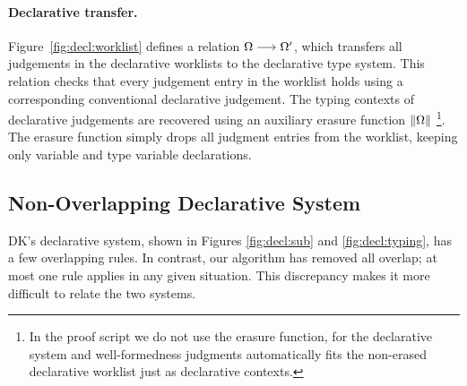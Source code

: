 \paragraph{Declarative transfer.}
Figure~\ref{fig:decl:worklist} defines a relation $\Omega \longrightarrow \Omega'$,
which transfers all judgements in the declarative worklists to the
declarative type system. This relation checks that every judgement entry in the worklist
holds using a corresponding conventional declarative judgement. 
The typing contexts of declarative judgements are recovered using an
auxiliary erasure function $\|\Omega\|$
\footnote{In the proof script we do not use the erasure function,
for the declarative system and well-formedness judgments automatically fits
the non-erased declarative worklist just as declarative contexts.}.
The erasure function simply drops all judgment entries from the worklist,
keeping only variable and type variable declarations.

\subsection{Non-Overlapping Declarative System}
\label{sec:metatheory:non-overlapping}

DK's declarative system, shown in Figures \ref{fig:decl:sub} and
\ref{fig:decl:typing}, has a few overlapping rules. In contrast, our algorithm
has removed all overlap; at most one rule applies in any given situation.
This discrepancy makes it more difficult to relate the two systems.

